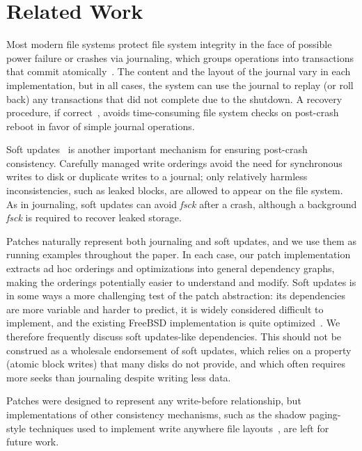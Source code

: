 \section{Related Work}
\label{sec:related}


Most modern file systems protect file system integrity in the face of
possible power failure or crashes via journaling, which groups
operations into transactions that commit
atomically~\cite{seltzer00journaling}.
The content and the layout of the
journal vary in each implementation, but in all cases, the system can use the
journal to replay (or roll back) any transactions that did not complete due to
the shutdown. A recovery procedure, if correct~\cite{yang04using}, 
avoids time-consuming
file system
checks on post-crash reboot in favor of simple journal operations.

Soft updates~\cite{ganger00soft} is another important mechanism for
ensuring post-crash consistency. Carefully managed write orderings
avoid the need for synchronous writes to disk or duplicate writes to
a journal; only relatively harmless inconsistencies, such as leaked blocks,
are allowed to appear on the file system. As in journaling, soft updates
can avoid \emph{fsck} after a crash, although a background \emph{fsck} is
required to recover leaked storage.

Patches naturally represent both journaling and soft updates,
and we use them as running examples throughout the paper.
%
In each case, our patch implementation extracts ad hoc orderings and
optimizations into general dependency graphs, making the orderings
potentially easier to understand and modify.
%
Soft updates is in some ways a more challenging test of the patch
abstraction: its dependencies are more variable and harder to predict,
it is widely considered difficult to implement, and the existing FreeBSD
implementation is quite optimized~\cite{mckusick99soft}.
%
We therefore frequently discuss soft updates-like
dependencies.
%
This should not be construed as a wholesale endorsement of soft updates,
which relies on a property (atomic block writes) that many disks do not
provide, and which often requires more seeks than journaling
despite writing less data.

Patches were designed to represent any write-before relationship, but
implementations of other consistency mechanisms, such as the shadow
paging-style techniques used to implement write anywhere file
layouts~\cite{hitz94file}, are left for future work.

